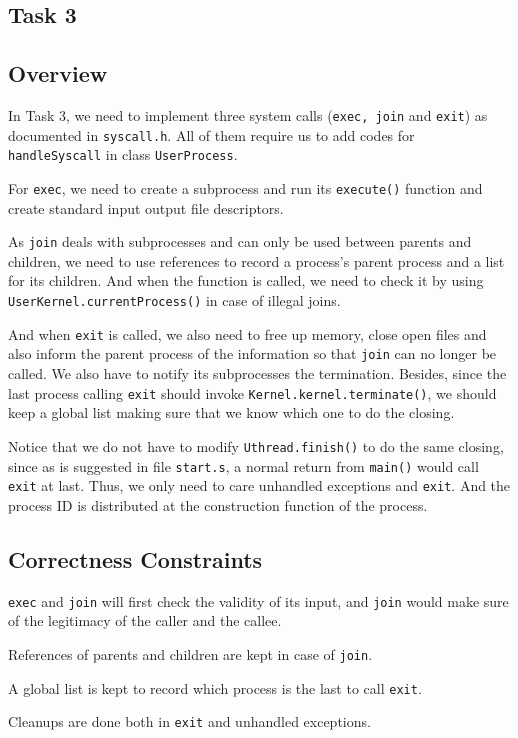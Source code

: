 \documentclass{article}
\begin{document}
\begin{spacing}{1.1}
\section{Task 3}
\subsection{Overview}
In Task 3, we need to implement three system calls (\texttt{exec, join} and \texttt{exit}) as documented in \texttt{syscall.h}. All of them require us to add codes for \texttt{handleSyscall} in class \texttt{UserProcess}.

For \texttt{exec}, we need to create a subprocess and run its \texttt{execute()} function and create standard input output file descriptors.

As \texttt{join} deals with subprocesses and can only be used between parents and children, we need to use references to record a process's parent process and a list for its children. And when the function is called, we need to check it by using \texttt{UserKernel.currentProcess()} in case of illegal joins.

And when \texttt{exit} is called, we also need to free up memory, close open files and also inform the parent process of the information so that \texttt{join} can no longer be called. We also have to notify its subprocesses the termination. Besides, since the last process calling \texttt{exit} should invoke \texttt{Kernel.kernel.terminate()}, we should keep a global list making sure that we know which one to do the closing.

Notice that we do not have to modify \texttt{Uthread.finish()} to do the same closing, since as is suggested in file \texttt{start.s}, a normal return from \texttt{main()} would call \texttt{exit} at last. Thus, we only need to care unhandled exceptions and \texttt{exit}. And the process ID is distributed at the construction function of the process.
\subsection{Correctness Constraints}
\begin{asparaitem}
  \item \texttt{exec} and \texttt{join} will first check the validity of its input, and \texttt{join} would make sure of the legitimacy of the caller and the callee.
  \item References of parents and children are kept in case of \texttt{join}.
  \item A global list is kept to record which process is the last to call \texttt{exit}.
  \item Cleanups are done both in \texttt{exit} and unhandled exceptions.
\end{asparaitem}

\end{spacing}
\end{document}
